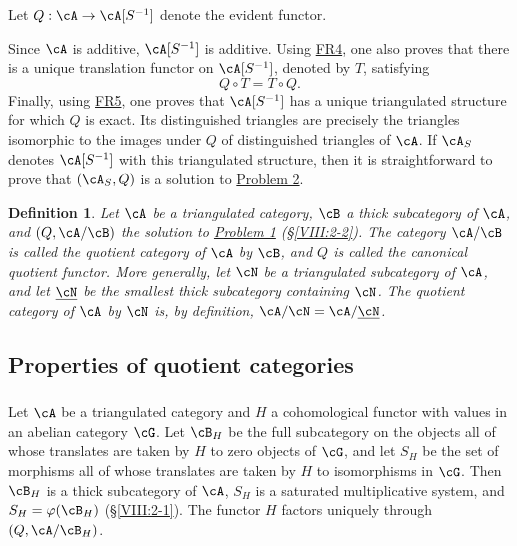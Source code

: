 \documentclass[12pt,oneside,english]{smfbook}
\newtheorem{definition}[subsubsection]{Definition}
\begin{document}
Let $Q:\cA\to\cA[S^{-1}]$ denote the evident functor.

Since $\cA$ is additive, $\cA[S^{-1}]$ is additive. Using \hyperlink{VIII:FR4}{FR4}, one also proves that there is a unique translation functor on $\cA[S^{-1}]$, denoted by $T$, satisfying
\[
  Q\circ T = T\circ Q \text{.}
\]
Finally, using \hyperlink{VIII:FR5}{FR5}, one proves that $\cA[S^{-1}]$ has a unique triangulated structure for which $Q$ is exact. Its distinguished triangles are precisely the triangles isomorphic to the images under $Q$ of distinguished triangles of $\cA$. If $\cA_S$ denotes $\cA[S^{-1}]$ with this triangulated structure, then it is straightforward to prove that $(\cA_S,Q)$ is a solution to \hyperlink{VIII:prob2}{Problem 2}.

\begin{definition}\label{VIII:2-3-3}
Let $\cA$ be a triangulated category, $\cB$ a thick subcategory of $\cA$, and $(Q,\cA/\cB)$ the solution to \hyperlink{VIII:prob1}{Problem 1} (\S \ref{VIII:2-2}). The category $\cA/\cB$ is called the \emph{quotient category} of $\cA$ by $\cB$, and $Q$ is called the canonical quotient functor. More generally, let $\cN$ be a triangulated subcategory of $\cA$, and let $\underline\cN$ be the smallest thick subcategory containing $\cN$. The quotient category of $\cA$ by $\cN$ is, by definition, $\cA/\cN=\cA/\underline\cN$.
\end{definition}

\subsection{Properties of quotient categories}\label{VIII:2-4}

\subsubsection{}\label{VIII:2-4-1}

Let $\cA$ be a triangulated category and $H$ a cohomological functor with values in an abelian category $\cG$. Let $\cB_H$ be the full subcategory on the objects all of whose translates are taken by $H$ to zero objects of $\cG$, and let $S_H$ be the set of morphisms all of whose translates are taken by $H$ to isomorphisms in $\cG$. Then $\cB_H$ is a thick subcategory of $\cA$, $S_H$ is a saturated multiplicative system, and $S_H=\varphi(\cB_H)$ (\S \ref{VIII:2-1}). The functor $H$ factors uniquely through $(Q,\cA/\cB_H)$.
\end{document}
